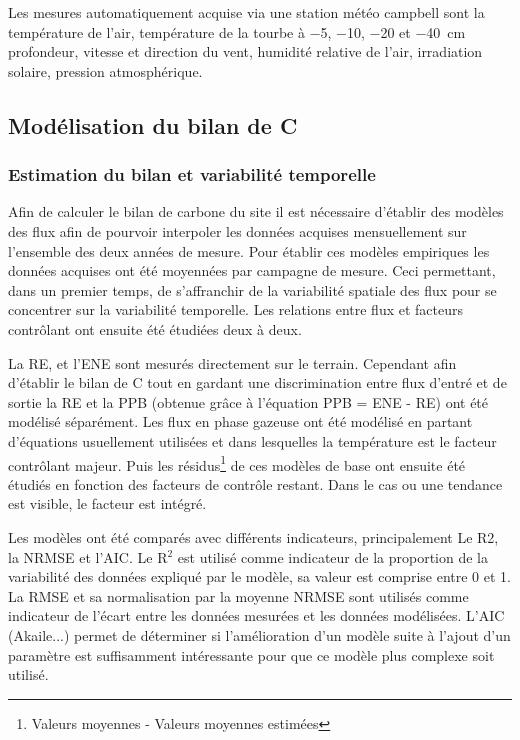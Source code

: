 Les mesures automatiquement acquise via une station météo campbell sont la température de l'air, température de la tourbe à \num{-5}, \num{-10}, \num{-20} et \SI{-40}{\centi\metre} profondeur, vitesse et direction du vent, humidité relative de l'air, irradiation solaire, pression atmosphérique.

\subsection{Modélisation du bilan de C}

\subsubsection{Estimation du bilan et variabilité temporelle}

Afin de calculer le bilan de carbone du site il est nécessaire d'établir des modèles des flux afin de pourvoir interpoler les données acquises mensuellement sur l'ensemble des deux années de mesure.
Pour établir ces modèles empiriques les données acquises ont été moyennées par campagne de mesure.
Ceci permettant, dans un premier temps, de s'affranchir de la variabilité spatiale des flux pour se concentrer sur la variabilité temporelle.
Les relations entre flux et facteurs contrôlant ont ensuite été étudiées deux à deux.

La RE, et l'ENE sont mesurés directement sur le terrain.
Cependant afin d'établir le bilan de C tout en gardant une discrimination entre flux d'entré et de sortie la RE et la PPB (obtenue grâce à l'équation PPB = ENE - RE) ont été modélisé séparément.
Les flux en phase gazeuse ont été modélisé en partant d'équations usuellement utilisées et dans lesquelles la température est le facteur contrôlant majeur.
Puis les résidus\footnote{Valeurs moyennes - Valeurs moyennes estimées} de ces modèles de base ont ensuite été étudiés en fonction des facteurs de contrôle restant.
Dans le cas ou une tendance est visible, le facteur est intégré.

Les modèles ont été comparés avec différents indicateurs, principalement Le R2, la NRMSE et l'AIC.
Le R$^{2}$ est utilisé comme indicateur de la proportion de la variabilité des données expliqué par le modèle, sa valeur est comprise entre 0 et 1.
La RMSE et sa normalisation par la moyenne NRMSE sont utilisés comme indicateur de l'écart entre les données mesurées et les données modélisées.
L'AIC (Akaile...) permet de déterminer si l'amélioration d'un modèle suite à l'ajout d'un paramètre est suffisamment intéressante pour que ce modèle plus complexe soit utilisé.

